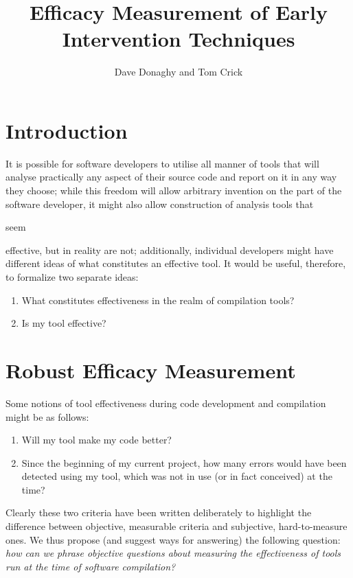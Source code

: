 \documentclass{eceasst}
\title{Efficacy Measurement of Early Intervention Techniques} %
\author{%
Dave Donaghy\autref{1} and
Tom Crick\autref{2}}
\institute{%
\autlabel{1} \email{dave.donaghy@hp.com}\\
HP Bristol, UK\par
\autlabel{2} \email{tcrick@cardiffmet.ac.uk}\\
Department of Computing\\
Cardiff Metropolitan University, UK}
\begin{document}
\maketitle

\section{Introduction}

It is possible for software developers to utilise all manner of tools
that will analyse practically any aspect of their source code and
report on it in any way they choose; while this freedom will allow
arbitrary invention on the part of the software developer, it might
also allow construction of analysis tools that \begin{em}seem\end{em}
effective, but in reality are not; additionally, individual developers
might have different ideas of what constitutes an effective tool. It
would be useful, therefore, to formalize two separate ideas:

\begin{enumerate}
\item What constitutes effectiveness in the realm of compilation tools?
\item Is my tool effective?
\end{enumerate}

\section{Robust Efficacy Measurement}

Some notions of tool effectiveness during code development and compilation
might be as follows:

\begin{enumerate}
\item Will my tool make my code better?
\item Since the beginning of my current project, how many errors would
have been detected using my tool, which was not in use (or in fact
conceived) at the time?
\end{enumerate}

Clearly these two criteria have been written deliberately to highlight
the difference between objective, measurable criteria and subjective,
hard-to-measure ones. We thus propose (and suggest ways for answering)
the following question: {\emph{how can we phrase objective questions about
measuring the effectiveness of tools run at the time of software
compilation?}}
\end{document}
